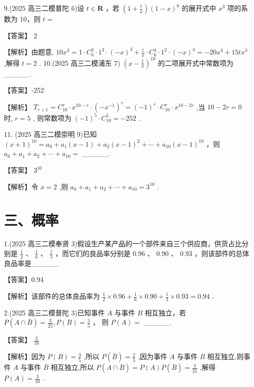 \documentclass[10pt]{article}
\begin{document}
9.(2025 高三二模普陀 6)设 \(t \in  \mathbf{R}\) ，若 \(\left( {1 + \frac{t}{x}}\right) {\left( 1 - x\right) }^{6}\) 的展开式中 \({x}^{3}\) 项的系数为 10，则 \(t =\)

【答案】 2

【解析】由题意, \({10}{x}^{3} = 1 \cdot  {C}_{6}^{3} \cdot  {1}^{3} \cdot  {\left( -x\right) }^{3} + \frac{t}{x} \cdot  {C}_{6}^{4} \cdot  {1}^{2} \cdot  {\left( -x\right) }^{4} =  - {20}{x}^{3} + {15t}{x}^{3}\) ,解得 \(t = 2\) . 10.(2025 高三二模浦东 7) \({\left( x - \frac{1}{x}\right) }^{10}\) 的二项展开式中常数项为\_\_\_\_\_.

【答案】-252

【解析】 \({T}_{r + 1} = {C}_{10}^{r} \cdot  {x}^{{10} - r} \cdot  {\left( -{x}^{-1}\right) }^{r} = {\left( -1\right) }^{r} \cdot  {C}_{10}^{r} \cdot  {x}^{{10} - {2r}}\) ,当 \({10} - {2r} = 0\) 时, \(r = 5\) , 则常数项为 \({\left( -1\right) }^{5} \cdot  {C}_{10}^{5} =  - {252}\) .

11. (2025 高三二模崇明 9)已知 \({\left( x + 1\right) }^{10} = {a}_{0} + {a}_{1}\left( {x - 1}\right)  + {a}_{2}{\left( x - 1\right) }^{2} + \cdots  + {a}_{10}{\left( x - 1\right) }^{10}\) ，则 \({a}_{0} + {a}_{1} + {a}_{2} + \cdots  + {a}_{10} =\) \_\_\_\_\_.

【答案】 \({3}^{10}\)

【解析】令 \(x = 2\) ,则 \({a}_{0} + {a}_{1} + {a}_{2} + \cdots  + {a}_{10} = {3}^{10}\) .

\section*{三、概率}

1.(2025 高三二模奉贤 3)假设生产某产品的一个部件来自三个供应商，供货占比分别是 \(\frac{1}{2}\) 、 \(\frac{1}{6}\text{ 、 }\frac{1}{3}\) ，而它们的良品率分别是 \({0.96}\text{ 、 }{0.90}\text{ 、 }{0.93}\) ，则该部件的总体良品率是\_\_\_\_\_.

【答案】0.94

【解析】该部件的总体良品率为 \(\frac{1}{2} \times  {0.96} + \frac{1}{6} \times  {0.90} + \frac{1}{3} \times  {0.93} = {0.94}\) .

2.(2025 高三二模普陀 3)已知事件 \(A\) 与事件 \(B\) 相互独立，若 \(P\left( {A \cap  \bar{B}}\right)  = \frac{3}{25},P\left( B\right)  = \frac{3}{5}\) ， 则 \(P\left( A\right)  =\) \_\_\_\_\_.

【答案】 \(\frac{3}{10}\)

【解析】因为 \(P\left( B\right)  = \frac{3}{5}\) ,所以 \(P\left( \bar{B}\right)  = \frac{2}{5}\) ,因为事件 \(A\) 与事件 \(B\) 相互独立,则事件 \(A\) 与事件 \(\bar{B}\) 相互独立,所以 \(P\left( {A \cap  \bar{B}}\right)  = P\left( A\right) P\left( \bar{B}\right)  = \frac{3}{25}\) ,解得 \(P\left( A\right)  = \frac{3}{10}\) .
\end{document}
